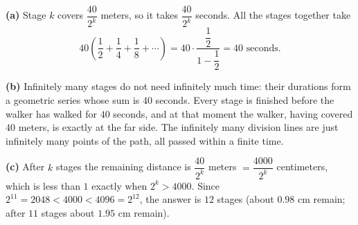 \textbf{(a)} Stage $k$ covers $\dfrac{40}{2^k}$ meters, so it takes $\dfrac{40}{2^k}$ seconds. All the stages together take
\[40\left(\dfrac12+\dfrac14+\dfrac18+\cdots\right)=40\cdot\dfrac{\dfrac12}{1-\dfrac12}=\boxed{40\text{ seconds}}.\]

\textbf{(b)} Infinitely many stages do not need infinitely much time: their durations form a geometric series whose sum is $40$ seconds. Every stage is finished before the walker has walked for $40$ seconds, and at that moment the walker, having covered $40$ meters, is exactly at the far side. The infinitely many division lines are just infinitely many points of the path, all passed within a finite time.

\textbf{(c)} After $k$ stages the remaining distance is $\dfrac{40}{2^k}$ meters $=\dfrac{4000}{2^k}$ centimeters, which is less than $1$ exactly when $2^k>4000$. Since $2^{11}=2048<4000<4096=2^{12}$, the answer is $\boxed{12}$ stages (about $0.98$ cm remain; after $11$ stages about $1.95$ cm remain).
